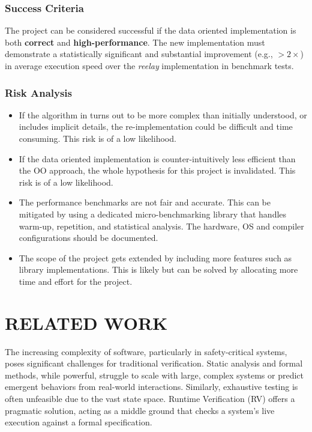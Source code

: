 \documentclass[a4paper,12pt]{report}
\begin{document}
\subsection{Success Criteria}
The project can be considered successful if the data oriented implementation is both \textbf{correct} and \textbf{high-performance}. The new implementation must demonstrate a statistically significant and substantial improvement (e.g., $> 2\times$) in average execution speed over the \textit{reelay} implementation in benchmark tests.

\subsection{Risk Analysis}
\begin{itemize}
    \item If the algorithm in \cite{Ulus19} turns out to be more complex than initially understood, or includes implicit details, the re-implementation could be difficult and time consuming. This risk is of a low likelihood.
   \item If the data oriented implementation is counter-intuitively less efficient than the OO approach, the whole hypothesis for this project is invalidated. This risk is of a low likelihood.
   \item The performance benchmarks are not fair and accurate. This can be mitigated by using a dedicated micro-benchmarking library that handles warm-up, repetition, and statistical analysis. The hardware, OS and compiler configurations should be documented.
   \item The scope of the project gets extended by including more features such as library implementations. This is likely but can be solved by allocating more time and effort for the project.
\end{itemize}


\chapter{RELATED WORK}
The increasing complexity of software, particularly in safety-critical systems, poses significant challenges for traditional verification. Static analysis and formal methods, while powerful, struggle to scale with large, complex systems or predict emergent behaviors from real-world interactions. Similarly, exhaustive testing is often unfeasible due to the vast state space. Runtime Verification (RV) offers a pragmatic solution, acting as a middle ground that checks a system's live execution against a formal specification.
\end{document}
